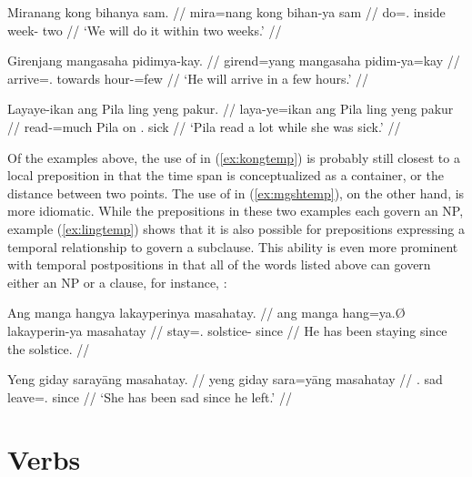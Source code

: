 \pex
\a\label{ex:kongtemp}\begingl
	\gla Miranang kong bihanya sam. //
	\glb mira=nang kong bihan-ya sam //
	\glc do=\Fpl{}.\Aarg{} inside week-\Loc{} two //
	\glft `We will do it within two weeks.' //
\endgl

\a\label{ex:mgshtemp}\begingl
	\gla Girenjang mangasaha pidimya-kay. //
	\glb girend=yang mangasaha pidim-ya=kay //
	\glc arrive=\TsgM{}.\Aarg{} towards hour-\Loc{}=few //
	\glft `He will arrive in a few hours.' //
\endgl

\a\label{ex:lingtemp}\begingl
	\gla Layaye-ikan ang Pila ling yeng pakur. //
	\glb laya-ye=ikan ang Pila ling yeng pakur //
	\glc read-\TsgF{}=much \Aarg{} Pila on \TsgF{}.\Aarg{} sick //
	\glft `Pila read a lot while she was sick.' //
\endgl

\xe

Of the examples above, the use of  in (\ref{ex:kongtemp}) is
probably still closest to a local preposition in that the time span is
conceptualized as a container, or the distance between two points. The use of
 in (\ref{ex:mgshtemp}), on the other hand, is more
idiomatic. While the prepositions in these two examples each govern an NP,
example (\ref{ex:lingtemp}) shows that it is also possible for prepositions
expressing a temporal relationship to govern a subclause. This ability is even
more prominent with temporal postpositions in that all of the words listed
above can govern either an NP or a clause, for instance,
:

\pex
\a\label{ex:mshtaynp}\begingl
	\gla Ang manga hangya lakayperinya masahatay. //
	\glb ang manga hang=ya.Ø lakayperin-ya masahatay //
	\glc \AgtT{} \Prog{} stay=\TsgM{}.\Top{} solstice-\Loc{} since //
	\glft He has been staying since the solstice. //
\endgl

\a\label{ex:mshtays}\begingl
	\gla Yeng giday sarayāng masahatay. //
	\glb yeng giday sara=yāng masahatay //
	\glc \TsgF{}.\Aarg{} sad leave=\TsgM{}.\Aarg{} since //
	\glft `She has been sad since he left.' //
\endgl

\xe



\section{Verbs}
\label{sec:verbs}

